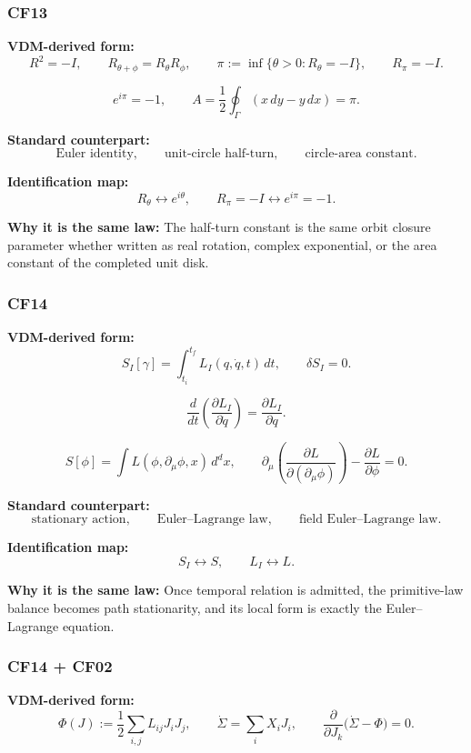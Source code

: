 \documentclass[11pt]{article}
\theoremstyle{definition}
\theoremstyle{plain}
\theoremstyle{remark}
\begin{document}
\subsubsection*{CF13}
\textbf{VDM-derived form:}
\[
R^2=-I,
\qquad
R_{\theta+\phi}=R_\theta R_\phi,
\qquad
\pi:=\inf\{\theta>0:R_\theta=-I\},
\qquad
R_\pi=-I.
\]

\[
e^{i\pi}=-1,
\qquad
A=\frac12\oint_\Gamma(x\,dy-y\,dx)=\pi.
\]

\textbf{Standard counterpart:}
\[
\text{Euler identity},
\qquad
\text{unit-circle half-turn},
\qquad
\text{circle-area constant}.
\]

\textbf{Identification map:}
\[
R_\theta \leftrightarrow e^{i\theta},
\qquad
R_\pi=-I \leftrightarrow e^{i\pi}=-1.
\]

\textbf{Why it is the same law:} The half-turn constant is the same orbit
closure parameter whether written as real rotation, complex exponential, or the
area constant of the completed unit disk.


\subsubsection*{CF14}
\textbf{VDM-derived form:}
\[
S_I[\gamma] = \int_{t_i}^{t_f} L_I(q,\dot q,t)\,dt,
\qquad
\delta S_I = 0.
\]

\[
\frac{d}{dt}\!\left(\frac{\partial L_I}{\partial \dot q}\right)
=
\frac{\partial L_I}{\partial q}.
\]

\[
S[\phi]=\int L(\phi,\partial_\mu\phi,x)\,d^dx,
\qquad
\partial_\mu\!\left(\frac{\partial L}{\partial(\partial_\mu\phi)}\right)
-
\frac{\partial L}{\partial\phi}
=0.
\]

\textbf{Standard counterpart:}
\[
\text{stationary action},
\qquad
\text{Euler--Lagrange law},
\qquad
\text{field Euler--Lagrange law}.
\]

\textbf{Identification map:}
\[
S_I \leftrightarrow S,
\qquad
L_I \leftrightarrow L.
\]

\textbf{Why it is the same law:} Once temporal relation is admitted, the
primitive-law balance becomes path stationarity, and its local form is exactly
the Euler--Lagrange equation.


\subsubsection*{CF14 + CF02}
\textbf{VDM-derived form:}
\[
\Phi(J) := \frac12\sum_{i,j}L_{ij}J_iJ_j,
\qquad
\dot\Sigma = \sum_i X_iJ_i,
\qquad
\frac{\partial}{\partial J_k}\bigl(\dot\Sigma-\Phi\bigr)=0.
\]
\end{document}
